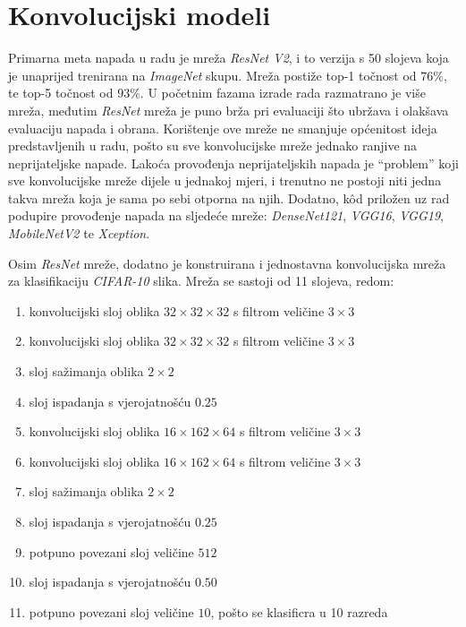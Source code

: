 \documentclass[utf8, diplomski]{fer}
\begin{document}
\section{Konvolucijski modeli}\label{custom_model}
Primarna meta napada u radu je mreža \textit{ResNet V2}\citep{resnetv2}, i to verzija s 50 slojeva koja je unaprijed trenirana na \textit{ImageNet} skupu. Mreža postiže top-1 točnost od $76\%$, te top-5 točnost od $93\%$.  U početnim fazama izrade rada razmatrano je više mreža, međutim \textit{ResNet} mreža je puno brža pri evaluaciji što ubržava i olakšava evaluaciju napada i obrana. Korištenje ove mreže ne smanjuje općenitost ideja predstavljenih u radu, pošto su sve konvolucijske mreže jednako ranjive na neprijateljske napade. Lakoća provođenja neprijateljskih napada je ``problem'' koji sve konvolucijske mreže dijele u jednakoj mjeri, i trenutno ne postoji niti jedna takva mreža koja je sama po sebi otporna na njih. Dodatno, kôd priložen uz rad podupire provođenje napada na sljedeće mreže: \textit{DenseNet121}, \textit{VGG16}, \textit{VGG19}, \textit{MobileNetV2} te \textit{Xception}.
\par
Osim \textit{ResNet} mreže, dodatno je konstruirana i jednostavna konvolucijska mreža za klasifikaciju \textit{CIFAR-10} slika. Mreža se sastoji od 11 slojeva, redom:
\begin{enumerate}[noitemsep, label=\textbullet]
  \item konvolucijski sloj oblika $32\times32\times32$ s filtrom veličine $3\times3$
  \item konvolucijski sloj oblika $32\times32\times32$ s filtrom veličine $3\times3$
  \item sloj sažimanja oblika $2\times2$
  \item sloj ispadanja s vjerojatnošću $0.25$
  \item konvolucijski sloj oblika $16\times162\times64$ s filtrom veličine $3\times3$
  \item konvolucijski sloj oblika $16\times162\times64$ s filtrom veličine $3\times3$
  \item sloj sažimanja oblika $2\times2$
  \item sloj ispadanja s vjerojatnošću $0.25$
  \item potpuno povezani sloj veličine $512$
  \item sloj ispadanja s vjerojatnošću $0.50$
  \item potpuno povezani sloj veličine $10$, pošto se klasificra u 10 razreda
\end{enumerate}
\end{document}
